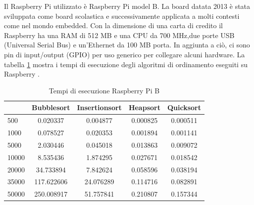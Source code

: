 \documentclass[12pt,a4paper]{report}
\begin{document}
Il Raspberry Pi utilizzato è Raspberry Pi model B. La board datata 2013 è stata sviluppata come board scolastica e successivamente applicata a molti contesti come nel mondo embedded.
Con la dimensione di una carta di credito il Raspberry ha una RAM di 512 MB e una CPU da 700 MHz,due porte USB (Universal Serial Bus) e un'Ethernet da 100 MB porta. In aggiunta a ciò, ci sono pin di input/output (GPIO) per uso generico per collegare alcuni hardware.  La tabella \ref{Tab:RaspSorting} mostra i tempi di esecuzione degli algoritmi di ordinamento eseguiti su Raspberry \cite{Rasp}.

\begin{table}[ht]
		\centering
		\begin{tabular}		{| l | c | c | c | c |}
		\hline
		      & Bubblesort & Insertionsort & Heapsort & Quicksort \\ \hline
500   & 0.020337      & 0.004877      & 0.000825 & 0.000511     \\ \hline
1000  & 0.078527	    & 0.020353      & 0.001894 & 0.001141     \\ \hline
5000  & 2.030446      & 0.045018     & 0.013863  & 0.009072   \\ \hline
10000 & 8.535436      & 1.874295     & 0.027671 & 0.018542     \\ \hline
20000 & 34.733894   & 7.842624      & 0.058596  & 0.038194   \\ \hline
35000 & 117.622606     & 24.076289     & 0.114716  & 0.082891   \\ \hline
50000 & 250.008917     & 51.757841   & 0.210807  & 0.157344  \\ \hline

		\end{tabular}
		\caption{Tempi di esecuzione Raspberry Pi B}
		\label{Tab:RaspSorting}
			\end{table}
\end{document}
